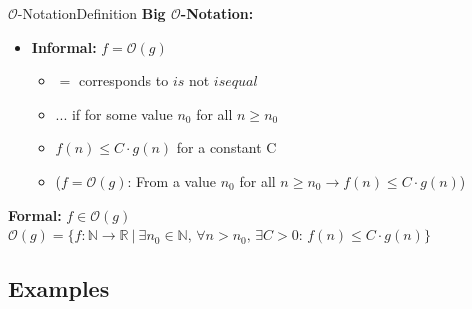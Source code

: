 \begin{frame}{$\mathcal{O}$-Notation}{Definition}
  \textbf{Big $\mathcal{O}$-Notation:}
  \begin{itemize}
    \item
      \textbf{Informal:} $f = \mathcal O(g)$\\
      
        \begin{itemize}
            \item
               $=$ corresponds to $is$ not $is equal$
            \item
               ... if for some value $n_0$ for all $n \geq n_0$
            \item
               $f(n) \leq C \cdot g(n)$ for a constant C
            \item 
                ($f = \mathcal O(g)$: From a value $n_0$ for all $n \geq n_0 \rightarrow f(n) \leq C \cdot g(n)$)
        \end{itemize}
  \end{itemize}
  \begin{block}{\textbf{Formal:} $f \in \mathcal O(g)$}
    \begin{math}
      \mathcal O(g) = \lbrace f: \mathbb{N} \to \mathbb{R} ~ | ~
        \exists n_0 \in \mathbb{N}, \, \forall n > n_0, \, \exists C > 0: \,
        f(n) \leq C \cdot g(n)\rbrace
    \end{math}
  \end{block}
\end{frame}


\subsection{Examples}

